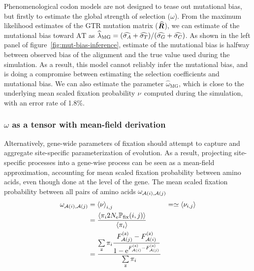 Phenomenological codon models are not designed to tease out mutational bias, but firstly to estimate the global strength of selection ($\omega$).
From the maximum likelihood estimates of the \acrshort{GTR} mutation matrix ($\widehat{\bm{R}}$), we can estimate of the mutational bias toward $\text{AT}$ as $\widehat{\lambda}_{\text{MG}} = (\widehat{\sigma_A} +\widehat{\sigma_T}) /(\widehat{\sigma_G} +\widehat{\sigma_C}) $.
As shown in the left panel of figure~\ref{fig:mut-bias-inference}, estimate of the mutational bias is halfway between observed bias of the alignment and the true value used during the simulation.
As a result, this model cannot reliably infer the mutational bias, and is doing a compromise between estimating the selection coefficients and mutational bias.
We can also estimate the parameter ${\widehat{\omega}_{\text{MG}}}$, which is close to the underlying mean scaled fixation probability $\nu$ computed during the simulation, with an error rate of 1.8\%.

\subsubsection{\texorpdfstring{$\omega$}{ω} as a tensor with mean-field derivation}

Alternatively, gene-wide parameters of fixation should attempt to capture and aggregate site-specific parameterization of evolution.
As a result, projecting site-specific processes into a gene-wise process can be seen as a mean-field approximation, accounting for mean scaled fixation probability between amino acids, even though done at the level of the gene.
The mean scaled fixation probability between all pairs of amino acids $\omega_{\mathcal{A}({i}), \mathcal{A}({j})}$
\begin{align}
    \omega_{\mathcal{A}({i}), \mathcal{A}({j})} & =\left\langle \nu \right\rangle_{{i}, {j}}
    & = \simeq \left\langle \nu_{{i}, {j}} \right\rangle \\
    & = \dfrac{ \left\langle \pi_{{i}} 2N_{\text{e}} \mathbb{P}_{\text{fix}}({i}, {j}) \right\rangle }{ \left\langle \pi_{{i}} \right\rangle } \\
    & = \dfrac{ \sum\limits_{\text{z}} \pi_{{i}}\dfrac{F_{\mathcal{A}({j})}^{(\text{z})} - F_{\mathcal{A}({i})}^{(\text{z})}}{1 - \text{e}^{F_{\mathcal{A}({i})}^{(\text{z})} - F_{\mathcal{A}({j})}^{(\text{z})}}} }{ \sum\limits_{\text{z}} \pi_{{i}} }
\end{align}

